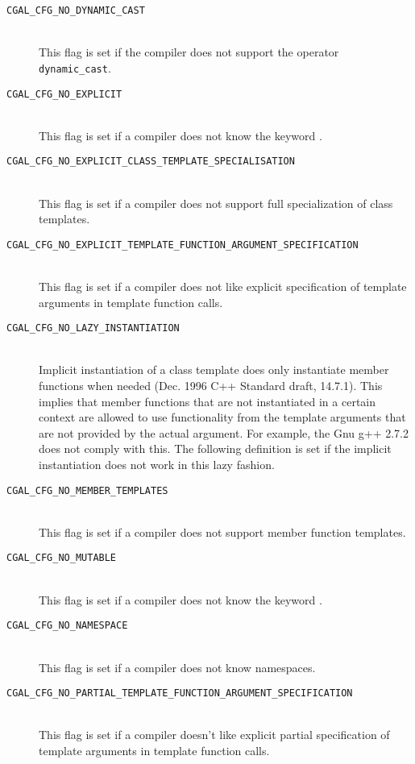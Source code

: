 \begin{description}
\item[{\tt CGAL\_CFG\_NO\_DYNAMIC\_CAST}]~\\ 
  This flag is set
  if the compiler does not support the operator \texttt{dynamic\_cast}.

\item[{\tt CGAL\_CFG\_NO\_EXPLICIT}]~\\
  This flag is set if a compiler does not know the keyword
  .

\item[{\tt CGAL\_CFG\_NO\_EXPLICIT\_CLASS\_TEMPLATE\_SPECIALISATION}]~\\
  This flag is set if a compiler does not support full specialization
  of class templates.

\item[{\tt CGAL\_CFG\_NO\_EXPLICIT\_TEMPLATE\_FUNCTION\_ARGUMENT\_SPECIFICATION}]~\\
  This flag is set if a compiler does not like explicit specification
  of template arguments in template function calls.

\item[{\tt CGAL\_CFG\_NO\_LAZY\_INSTANTIATION}]~\\
  Implicit instantiation of a class template does only instantiate
  member functions when needed (Dec. 1996 C++ Standard draft, 14.7.1).
  This implies that member functions that are not instantiated in a
  certain context are allowed to use functionality from the template
  arguments that are not provided by the actual argument. For example,
  the Gnu g++ 2.7.2 does not comply with this. The following definition
  is set if the implicit instantiation does not work in this lazy
  fashion.

\item[{\tt CGAL\_CFG\_NO\_MEMBER\_TEMPLATES}]~\\
  This flag is set if a compiler does not support member function
  templates.

\item[{\tt CGAL\_CFG\_NO\_MUTABLE}]~\\
  This flag is set if a compiler does not know the keyword
  .

\item[{\tt CGAL\_CFG\_NO\_NAMESPACE}]~\\
 This flag is set if a compiler does not know namespaces.

\item[{\tt CGAL\_CFG\_NO\_PARTIAL\_TEMPLATE\_FUNCTION\_ARGUMENT\_SPECIFICATION}]~\\
 This flag is set if a compiler doesn't like explicit partial 
 specification of template arguments in template function calls.


\end{description}
